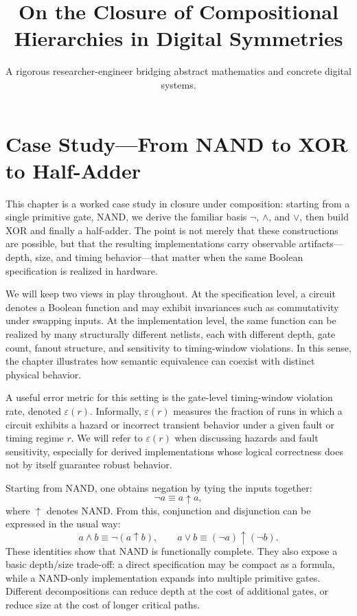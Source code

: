 \documentclass[11pt]{article}
\title{On the Closure of Compositional Hierarchies in Digital Symmetries}
\author{A rigorous researcher-engineer bridging abstract mathematics and concrete digital systems.}
\begin{document}
\section*{Case Study—From NAND to XOR to Half-Adder}

This chapter is a worked case study in closure under composition: starting from a single primitive gate, NAND, we derive the familiar basis \(\neg\), \(\wedge\), and \(\vee\), then build XOR and finally a half-adder. The point is not merely that these constructions are possible, but that the resulting implementations carry observable artifacts---depth, size, and timing behavior---that matter when the same Boolean specification is realized in hardware.

We will keep two views in play throughout. At the specification level, a circuit denotes a Boolean function and may exhibit invariances such as commutativity under swapping inputs. At the implementation level, the same function can be realized by many structurally different netlists, each with different depth, gate count, fanout structure, and sensitivity to timing-window violations. In this sense, the chapter illustrates how semantic equivalence can coexist with distinct physical behavior.

A useful error metric for this setting is the gate-level timing-window violation rate, denoted \(\varepsilon(r)\). Informally, \(\varepsilon(r)\) measures the fraction of runs in which a circuit exhibits a hazard or incorrect transient behavior under a given fault or timing regime \(r\). We will refer to \(\varepsilon(r)\) when discussing hazards and fault sensitivity, especially for derived implementations whose logical correctness does not by itself guarantee robust behavior.

Starting from NAND, one obtains negation by tying the inputs together:
\[
\neg a \equiv a \mathbin{\uparrow} a,
\]
where \(\uparrow\) denotes NAND. From this, conjunction and disjunction can be expressed in the usual way:
\[
 a \wedge b \equiv \neg(a \mathbin{\uparrow} b),
\qquad
 a \vee b \equiv (\neg a) \mathbin{\uparrow} (\neg b).
\]
These identities show that NAND is functionally complete. They also expose a basic depth/size trade-off: a direct specification may be compact as a formula, while a NAND-only implementation expands into multiple primitive gates. Different decompositions can reduce depth at the cost of additional gates, or reduce size at the cost of longer critical paths.
\end{document}
